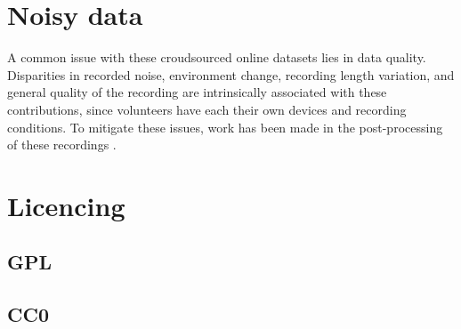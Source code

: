 \section{Noisy data}

A common issue with these croudsourced online datasets lies in data quality. Disparities in recorded noise, environment change, recording length variation, and general quality of the recording are intrinsically associated with these contributions, since volunteers have each their own devices and recording conditions. To mitigate these issues, work has been made in the post-processing of these recordings \cite{krishna2019speech}.

\section{Licencing}
\subsection{GPL}
\subsection{CC0}

